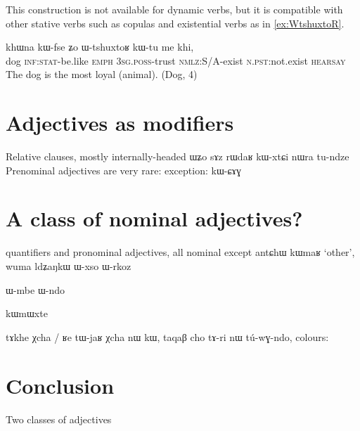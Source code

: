 \documentclass[oldfontcommands,oneside,a4paper,11pt]{article}
\newcommand{\ipa}[1]{{\phon \mbox{#1}}} %
\begin{document}
This construction is not available for dynamic verbs, but it is compatible with other stative verbs such as copulas and existential verbs as in  \ref{ex:WtshuxtoR}.
  \begin{exe}
\ex \label{ex:WtshuxtoR}
\gll 
\ipa{khɯna} 	\ipa{kɯ-fse} 	\ipa{ʑo}  \ipa{ɯ-tshuxtoʁ} 	\ipa{kɯ-tu} 	\ipa{me} 	\ipa{khi,} 	\\
dog \textsc{inf:stat}-be.like \textsc{emph} \textsc{3sg.poss}-trust \textsc{nmlz}:S/A-exist \textsc{n.pst}:not.exist  \textsc{hearsay} \\
\glt The dog is the most loyal (animal). (Dog, 4)
  \end{exe}
  
\section{Adjectives as modifiers}
Relative clauses, mostly internally-headed 
ɯʑo sɤz rɯdaʁ kɯ-xtɕi nɯra tu-ndze
\citet{jacques14relatives}
Prenominal adjectives are very rare: exception: \ipa{kɯ-ɕɤɣ} 
 
 \section{A class of nominal adjectives?}
 
 quantifiers and pronominal adjectives, all nominal except antɕhɯ
 \ipa{kɯmaʁ} `other',  \ipa{wuma}
 \ipa{ldʑaŋkɯ}
  \ipa{ɯ-xso}
    \ipa{ɯ-rkoz}
    
        \ipa{ɯ-mbe}
            \ipa{ɯ-ndo}
            
kɯmɯxte    
    
    tɤkhe
    χcha / ʁe
    tɯ-jaʁ χcha nɯ kɯ, taqaβ cho tɤ-ri nɯ tú-wɣ-ndo,
 colours: 


 
 \section{Conclusion}
 
 Two classes of adjectives
 
\end{document}
